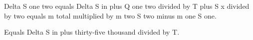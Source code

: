 Delta S one two equals Delta S in plus Q one two divided by T plus S x divided by two equals m total multiplied by m two S two minus m one S one.  

Equals Delta S in plus thirty-five thousand divided by T.
